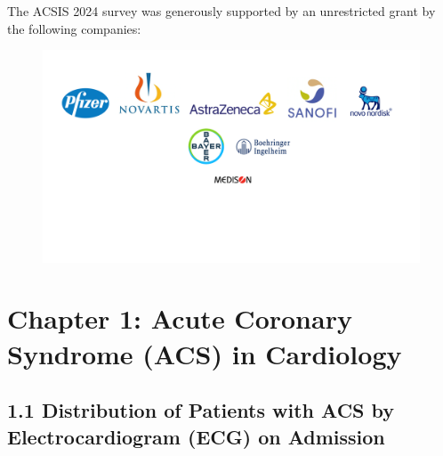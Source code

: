 \documentclass[
]{article}
\begin{document}
\pagebreak

The ACSIS 2024 survey was generously supported by an unrestricted grant
by the following companies:

\begin{figure}
\includegraphics[width=1.2\linewidth]{updated logo page} \end{figure}

\pagebreak

\section{Chapter 1: Acute Coronary Syndrome (ACS) in
Cardiology}\label{chapter-1-acute-coronary-syndrome-acs-in-cardiology}

\subsection{1.1 Distribution of Patients with ACS by Electrocardiogram
(ECG) on
Admission}\label{distribution-of-patients-with-acs-by-electrocardiogram-ecg-on-admission}

~
\end{document}
